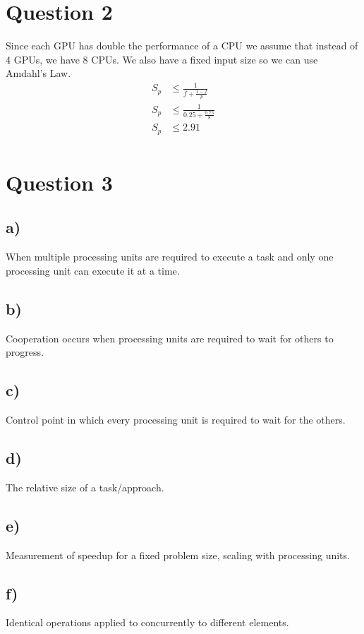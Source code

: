 \documentclass[a4paper, twocolumn]{article}
\begin{document}
\section{Question 2}
Since each GPU has double the performance of a CPU we assume that instead of 4 GPUs,
we have 8 CPUs.
We also have a fixed input size so we can use Amdahl's Law.
\begin{equation*}
    \begin{split}
        S_p & \le \frac{1}{f + \frac{1-f}{p}}\\
        S_p & \le \frac{1}{0.25 + \frac{0.75}{8}}\\
        S_p & \le 2.91\\
    \end{split}
\end{equation*}
\section{Question 3}
\subsection{a)}
When multiple processing units are required to execute a task and only one processing unit can execute it at a time.

\subsection{b)}
Cooperation occurs when processing units are required to wait for others to progress.

\subsection{c)}
Control point in which every processing unit is required to wait for the others.

\subsection{d)}
The relative size of a task/approach.

\subsection{e)}
Measurement of speedup for a fixed problem size, scaling with processing units.

\subsection{f)}
Identical operations applied to concurrently to different elements.
\end{document}
